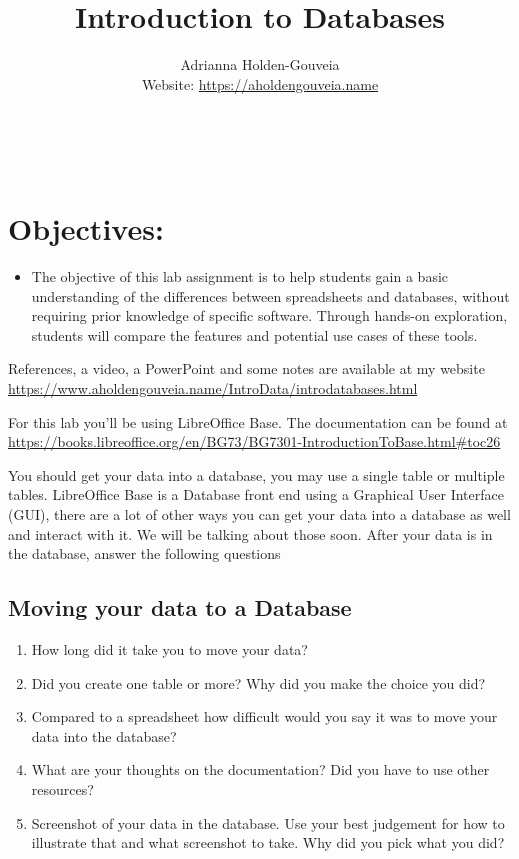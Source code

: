 \documentclass[12pt]{article}
\title{Introduction to Databases}
\author{
        Adrianna Holden-Gouveia \\
        Website: \url{https://aholdengouveia.name}\\ 
        \date{\vspace{-5ex}}
        \faLinkedin{: aholdengouveia} \\
        \faGithub {: aholdengouveia} \\
        }
\begin{document}
    

\maketitle


\section*{Objectives:}
\begin{itemize}
    \item The objective of this lab assignment is to help students gain a basic understanding of the differences between spreadsheets and databases, without requiring prior knowledge of specific software. Through hands-on exploration, students will compare the features and potential use cases of these tools.
\end{itemize}


References, a video, a PowerPoint and some notes are available at my website
\url {https://www.aholdengouveia.name/IntroData/introdatabases.html}

For this lab you'll be using LibreOffice Base.  The documentation can be found at \url{https://books.libreoffice.org/en/BG73/BG7301-IntroductionToBase.html#toc26}

You should get your data into a database, you may use a single table or multiple tables. LibreOffice Base is a Database front end using a Graphical User Interface (GUI), there are a lot of other ways you can get your data into a database as well and interact with it. We will be talking about those soon. After your data is in the database, answer the following questions




\subsection*{Moving your data to a Database}
    \begin{enumerate}
        \item How long did it take you to move your data?
        \item Did you create one table or more? Why did you make the choice you did?
        \item Compared to a spreadsheet how difficult would you say it was to move your data into the database?
        \item What are your thoughts on the documentation? Did you have to use other resources? 
        \item Screenshot of your data in the database.  Use your best judgement for how to illustrate that and what screenshot to take.  Why did you pick what you did?
    \end{enumerate}
\end{document}
